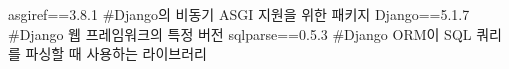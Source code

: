 asgiref==3.8.1 #Django의 비동기 ASGI 지원을 위한 패키지
Django==5.1.7 #Django 웹 프레임워크의 특정 버전
sqlparse==0.5.3 #Django ORM이 SQL 쿼리를 파싱할 때 사용하는 라이브러리
